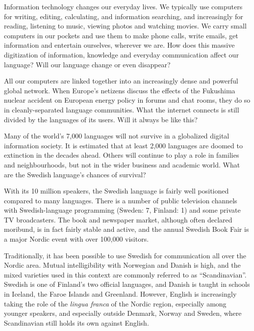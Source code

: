 \begin{multicols}{2}

Information technology changes our everyday lives. We typically use
computers for writing, editing, calculating, and information
searching, and increasingly for reading, listening to music, viewing
photos and watching movies. We carry small computers in our pockets
and use them to make phone calls, write emails, get information and
entertain ourselves, wherever we are. How does this massive
digitization of information, knowledge and everyday communication
affect our language? Will our language change or even disappear?


All our computers are linked together into an increasingly dense and
powerful global network. When Europe's netizens discuss the effects of
the Fukushima nuclear accident on European energy policy in forums and
chat rooms, they do so in cleanly-separated language communities. What
the internet connects is still divided by the languages of its
users. Will it always be like this?

Many of the world’s 7,000 languages will not survive in a globalized
digital information society. It is estimated that at least 2,000
languages are doomed to extinction in the decades ahead. Others will
continue to play a role in families and neighbourhoods, but not in the
wider business and academic world. What are the Swedish language’s
chances of survival?

With its 10 million speakers, the Swedish lang\-uage is fairly well
positioned compared to many lang\-uages. There is a number of public
tele\-vision \mbox{channels} with Swedish-language programming (Sweden: 7,
Finland: 1) and some private TV broadcasters. The book and newspaper
market, although often declared moribund, is in fact fairly \mbox{stable} and
active, and the annual Swedish Book Fair is a major Nordic event with
over 100,000 visitors.

Traditionally, it has been possible to use Swedish for communication
all over the Nordic area. \mbox{Mutual} intelligibility with Norwegian and
\mbox{Danish} is high, and the mixed varieties used in this context are
commonly referred to as ``Scandinavian''. Swedish is one of Finland's
two official languages, and \mbox{Danish} is taught in schools in Iceland,
the Faroe \mbox{Islands} and Greenland. However, English is increasingly
taking the role of the \emph{lingua franca} of the Nordic \mbox{region}, especially
among younger speakers, and especially outside Denmark, Norway and
\mbox{Sweden}, where Scandinavian still holds its own against \mbox{English}.


\end{multicols}
